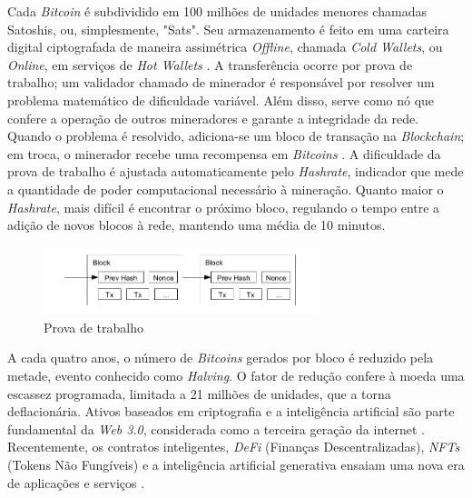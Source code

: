 Cada \textit{Bitcoin} é subdividido em 100 milhões de unidades menores chamadas Satoshis, ou, simplesmente, "Sats".
Seu armazenamento é feito em uma carteira digital ciptografada de maneira assimétrica \textit{Offline}, chamada \textit{Cold Wallets}, ou \textit{Online}, em serviços de \textit{Hot Wallets} \cite{wallet}.
A transferência ocorre por prova de trabalho; um validador chamado de minerador é responsável por resolver um problema matemático de dificuldade variável. Além disso, serve como nó que confere a operação de outros mineradores e garante a integridade da rede.
Quando o problema é resolvido, adiciona-se um bloco de transação na \textit{Blockchain}; em troca, o minerador recebe uma recompensa em \textit{Bitcoins} \cite{pow}.
A dificuldade da prova de trabalho é ajustada automaticamente pelo \textit{Hashrate}, indicador que mede a quantidade de poder computacional necessário à mineração. Quanto maior o \textit{Hashrate}, mais difícil é encontrar o próximo bloco, regulando o tempo entre a adição de novos blocos à rede, mantendo uma média de 10 minutos.

\begin{figure}[!htb] \centering
    \caption{Prova de trabalho} \label{figura:imageNonce}
    \begin{varwidth}{\linewidth}
      \includegraphics[width=8cm]{figuras/nonce.png}
    \end{varwidth}
  \end{figure}

A cada quatro anos, o número de \textit{Bitcoins} gerados por bloco é reduzido pela metade, evento conhecido como \textit{Halving}.
O fator de redução confere à moeda uma escassez programada, limitada a 21 milhões de unidades, que a torna deflacionária.
Ativos baseados em criptografia e a inteligência artificial são parte fundamental da \textit{Web 3.0}, considerada como a terceira geração da internet \cite{web3}.
Recentemente, os contratos inteligentes, \textit{DeFi} (Finanças Descentralizadas), \textit{NFTs} (Tokens Não Fungíveis) e a inteligência artificial generativa ensaiam uma nova era de aplicações e serviços \cite{books}.

